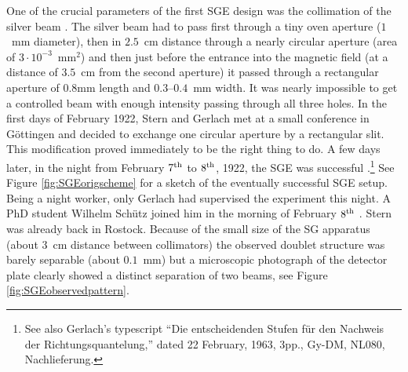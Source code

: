 \documentclass[12pt]{article}
\begin{document}
One of the crucial parameters of the first SGE design was the collimation of the silver beam \citep{GerlachWEtal1922Nachweis}. The silver beam had to pass first through a tiny oven aperture ($1$~mm diameter), then in $2.5$~cm distance through a nearly circular aperture (area of $3\cdot10^{-3}$~mm$^2$) and then just before the entrance into the magnetic field (at a distance of $3.5$~cm from the second aperture) it passed through a rectangular aperture of $0.8$mm length and $0.3$--$0.4$~mm width. It was nearly impossible to get a controlled beam with enough intensity passing through all three holes. In the first days of February 1922, Stern and Gerlach met at a small conference in Göttingen \citep{FriedrichBEtal2003Stern} and decided to exchange one circular aperture by a rectangular slit. This modification proved immediately to be the right thing to do. A few days later, in the night from February $7^{\rm th}$ to $8^{\rm th}$, 1922, the SGE was successful \citep{GerlachWEtal1922Nachweis}.\footnote{See also Gerlach's typescript ``Die entscheidenden Stufen f\"ur den Nachweis der Richtungsquantelung,'' dated 22 February, 1963, 3pp., Gy-DM, NL080, Nachlieferung.}  See Figure \ref{fig:SGEorigscheme} for a sketch of the eventually successful SGE setup. Being a night worker, only Gerlach had supervised the experiment this night. A PhD student Wilhelm Schütz joined him in the morning of February $8^{\rm th}$ \citep{SchuetzW1969Erinnerungen}. Stern was already back in Rostock. Because of the small size of the SG apparatus (about $3$~cm distance between collimators) the observed doublet structure was barely separable (about $0.1$~mm) but a microscopic photograph of the detector plate clearly showed a distinct separation of two beams, see Figure \ref{fig:SGEobservedpattern}.
\end{document}
